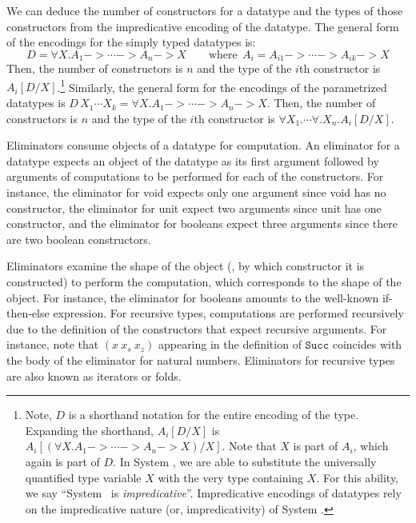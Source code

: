 We can deduce the number of constructors for a datatype and the types
of those constructors from the impredicative encoding of the datatype.
The general form of the encodings for the simply typed datatypes is:
\[D = \forall X. A_1 -> \cdots -> A_n -> X
	\qquad\text{where}~~ A_i = A_{i1} -> \cdots -> A_{ik} -> X \]
Then, the number of constructors is $n$ and
the type of the $i$th constructor is $A_i[D/X]$.\footnote{
	Note, $D$ is a shorthand notation for the entire encoding of the type.
	Expanding the shorthand, $A_i[D/X]$ is
	$A_i[(\forall X. A_1 -> \cdots -> A_n -> X)/ X]$.
	Note that $X$ is part of $A_i$, which again is part of $D$.
	In System \F, we are able to substitute the universally quantified
	type variable $X$ with the very type containing $X$. For this ability,
	we say ``System \F\ is \emph{impredicative}''. Impredicative encodings
	of datatypes rely on the impredicative nature (or, impredicativity)
	of System \F.}
Similarly, the general form for the encodings of the parametrized datatypes is
$D\,X_1 \cdots X_k = \forall X. A_1 -> \cdots -> A_n -> X$. Then,
the number of constructors is $n$ and the type of the $i$th constructor
is $\forall X_1.\cdots\forall.X_n.A_i[D/X]$.

Eliminators consume objects of a datatype for computation.
An eliminator for a datatype expects an object of the datatype
as its first argument followed by arguments of computations
to be performed for each of the constructors. For instance,
the eliminator for void expects only one argument since void has no constructor,
the eliminator for unit expect two arguments since unit has one constructor, and
the eliminator for booleans expect three arguments since there are two
boolean constructors.

Eliminators examine the shape of the object (\ie, by which constructor it is
constructed) to perform the computation, which corresponds to the shape
of the object. For instance, the eliminator for booleans amounts to the
well-known if-then-else expression.
For recursive types, computations are performed recursively due to
the definition of the constructors that expect recursive arguments.
For instance, note that $(x~x_s~x_z)$ appearing in the definition of
$\mathtt{Succ}$ coincides with the body of the eliminator for natural numbers.
Eliminators for recursive types are also known as iterators or folds.

